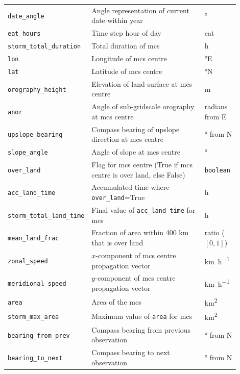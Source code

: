 {\begin{longtable}{>{\raggedright\arraybackslash}p{0.25\linewidth} p{0.50\linewidth} >{\raggedright\arraybackslash}p{0.15\linewidth}}
    \texttt{date\_angle} & Angle representation of current date within year & \unit{\degree} \\
    \texttt{eat\_hours} & Time step hour of day & \acrlong{eat} \\
    \texttt{storm\_total\_duration} & Total duration of \acrshort{mcs} & \unit{\hour} \\
    \texttt{lon} & Longitude of \acrshort{mcs} centre & \unit{\degree}E \\
    \texttt{lat} & Latitude of \acrshort{mcs} centre & \unit{\degree}N \\
    \texttt{orography\_height} & Elevation of land surface at \acrshort{mcs} centre & \unit{\meter} \\
    \texttt{anor} & Angle of sub-gridscale orography at \acrshort{mcs} centre & radians from E \\
    \texttt{upslope\_bearing} & Compass bearing of upslope direction at \acrshort{mcs} centre & \unit{\degree} from  N \\
    \texttt{slope\_angle} & Angle of slope at \acrshort{mcs} centre & \unit{\degree} \\
    \texttt{over\_land} & Flag for \acrshort{mcs} centre (True if \acrshort{mcs} centre is over land, else False) & \texttt{boolean} \\
    \texttt{acc\_land\_time} & Accumulated time where \texttt{over\_land}=True & \unit{\hour} \\
    \texttt{storm\_total\_land\_time} & Final value of \texttt{acc\_land\_time} for \acrshort{mcs} & \unit{\hour} \\
    \texttt{mean\_land\_frac} & Fraction of area within 400 km that is over land & ratio ($[0,1]$) \\
    \texttt{zonal\_speed} & $x$-component of \acrshort{mcs} centre propagation vector & \unit{\km\per\hour} \\
    \texttt{meridional\_speed} & $y$-component of \acrshort{mcs} centre propagation vector & \unit{\km\per\hour} \\
    \texttt{area} & Area of the \acrshort{mcs} & \unit{\km\squared} \\
    \texttt{storm\_max\_area} & Maximum value of \texttt{area} for \acrshort{mcs} & \unit{\km\squared} \\
    \texttt{bearing\_from\_prev} & Compass bearing from previous observation & \unit{\degree} from  N \\
    \texttt{bearing\_to\_next} & Compass bearing to next observation & \unit{\degree} from  N \\

\end{longtable}}
